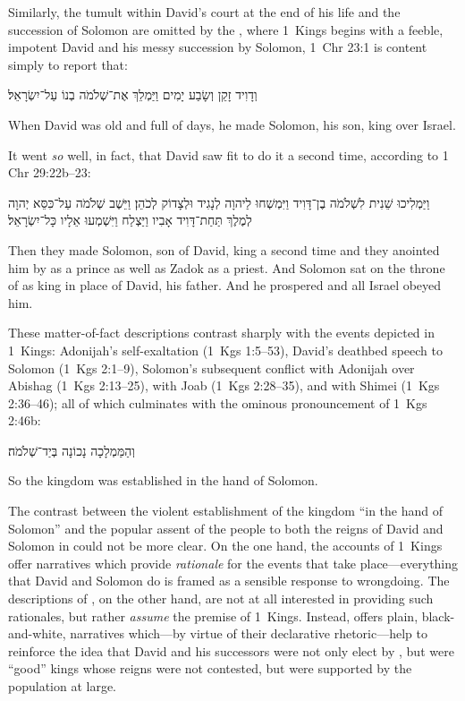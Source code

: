  Similarly, the tumult within David's court at the end of his life and the succession of Solomon are omitted by the \chronicler, where 1~Kings begins with a feeble, impotent David and his messy succession by Solomon, 1~Chr 23:1 is content simply to report that:
\begin{hebrewtext}
    וְדָוִיד זָקֵן וְשָׂבַע יָמִים וַיַּמְלֵךְ אֶת־שְׁלֹמֹה בְנוֹ עַל־יִשְׂרָאֵל׃
\end{hebrewtext}
\begin{translation}
    When David was old and full of days, he made Solomon, his son, king over Israel.
\end{translation}
\noindent
It went \emph{so} well, in fact, that David saw fit to do it a second time, according to 1 Chr 29:22b--23:
\begin{hebrewtext}
    וַיַּמְלִיכוּ שֵׁנִית לִשְׁלֹמֹה בֶן־דָּוִיד וַיִּמְשְׁחוּ לַיהוָה לְנָגִיד וּלְצָדוֹק לְכֹהֵן׃ 
    וַיֵּשֶׁב שְׁלֹמֹה עַל־כִּסֵּא יְהוָה לְמֶלֶךְ תַּחַת־דָּוִיד אָבִיו וַיַּצְלַח וַיִּשְׁמְעוּ אֵלָיו כָּל־יִשְׂרָאֵל׃
\end{hebrewtext}
\begin{translation}
    Then they made Solomon, son of David, king a second time and they anointed him by \yahweh as a prince as well as Zadok as a priest.
    And Solomon sat on the throne of \yahweh as king in place of David, his father. And he prospered and all Israel obeyed him.
\end{translation}
\noindent
These matter-of-fact descriptions contrast sharply with the events depicted in 1~Kings: Adonijah's self-exaltation (1~Kgs 1:5--53), David's deathbed speech to Solomon (1~Kgs 2:1--9), Solomon's subsequent conflict with Adonijah over Abishag (1~Kgs 2:13--25), with Joab (1~Kgs 2:28--35), and with Shimei (1~Kgs 2:36--46); all of which culminates with the ominous pronouncement of 1~Kgs 2:46b:
\begin{hebrewtext}
    וְהַמַּמְלָכָה נָכוֹנָה בְּיַד־שְׁלֹמֹה׃
\end{hebrewtext}
\begin{translation}
    So the kingdom was established in the hand of Solomon.
\end{translation}
\noindent
The contrast between the violent establishment of the kingdom ``in the hand of Solomon'' and the popular assent of the people to both the reigns of David and Solomon in \chronicles could not be more clear. On the one hand, the accounts of 1~Kings offer narratives which provide \emph{rationale} for the events that take place---everything that David and Solomon do is framed as a sensible response to wrongdoing. The  descriptions of \chronicles, on the other hand, are not at all interested in providing such rationales, but rather \emph{assume} the premise of 1~Kings. Instead, \chronicles offers plain, black-and-white, narratives which---by virtue of their declarative rhetoric---help to reinforce the idea that David and his successors were not only elect by \yahweh, but were ``good'' kings whose reigns were not contested, but were supported by the population at large.

